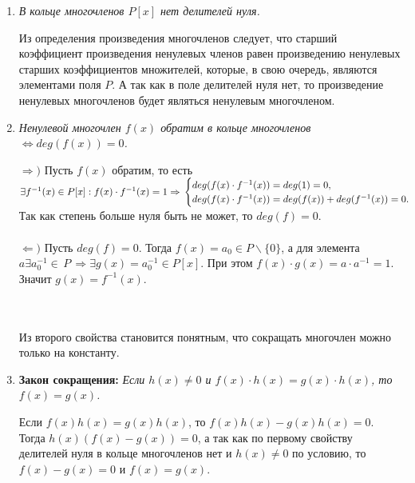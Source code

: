 \begin{enumerate}
	\item \textit{В кольце многочленов $P[x]$ нет делителей нуля.}
	\begin{Proof}
		Из определения произведения многочленов следует, что старший коэффициент произведения ненулевых членов равен произведению ненулевых старших коэффициентов множителей, которые, в свою очередь, являются элементами поля $P$. А так как в поле делителей нуля нет, то произведение ненулевых многочленов 
		будет являться ненулевым многочленом. 
	\end{Proof}
	\item \textit{Ненулевой многочлен $f(x)$ обратим в кольце многочленов $\Longleftrightarrow deg(f(x)) = 0$.}
	\begin{Proof}
		$\Rightarrow)$ Пусть $f(x)$ обратим, то есть $\exists f^{-1}(x)\in P[x]:f(x)\cdot f^{-1}(x) = 1 \Rightarrow\\ \begin{cases}
			deg(f(x)\cdot f^{-1}(x)) = deg(1) = 0 ,\\
			deg(f(x)\cdot f^{-1}(x)) = deg(f(x)) + deg(f^{-1}(x)) = 0.
		\end{cases}$ 
		Так как степень больше нуля быть не может, то $deg(f) = 0.$\\\\
		$\Leftarrow)$ Пусть $deg(f) = 0$. Тогда $f(x) = a_0 \in  P \backslash \{0\}$, а для элемента $a \exists  a_0^{-1} \in \, P \, \Rightarrow \exists g(x) = a_0^{-1} \in P[x]$. При этом $f(x)\cdot g(x) = a\cdot a^{-1} = 1$. Значит $g(x) = f^{-1}(x)$.
	\end{Proof}\\\\
	Из второго свойства становится понятным, что сокращать многочлен можно только на константу.
	\item \textbf{Закон сокращения:} \textit{Если $h(x) \not=  0$ и $f(x)\cdot h(x) = g(x)\cdot h(x)$, то $f(x) = g(x)$.}
	\begin{Proof}
		Если $f(x)h(x) = g(x)h(x)$, то $f(x)h(x) - g(x)h(x) = 0$. Тогда $h(x)(f(x) - g(x)) = 0$, а так как по первому 
		свойству делителей нуля в кольце многочленов нет и $h(x) \not= 0$ по условию, то $f(x) - g(x) = 0$ и $f(x) = g(x)$. 
	\end{Proof}
\end{enumerate}

